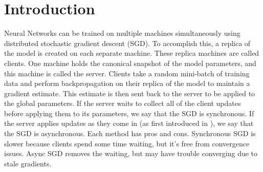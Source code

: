 \documentclass{article} %
\title{\scalebox{1}{Faster Asynchronous SGD}}
\author{
\hspace{20mm} Augustus Odena \\
\hspace{10mm} \texttt{augustus.odena@gmail.com}
}
\begin{document}
\begin{center}
\maketitle
\end{center}

\begin{abstract}

Asynchronous distributed stochastic gradient descent methods have trouble converging because of stale gradients.
A gradient update sent to a parameter server by a client is stale if the parameters used to calculate that gradient have since been updated on the server.
Approaches have been proposed to circumvent this problem that quantify staleness in terms of the number of elapsed updates.
In this work, we propose a method that quantifies staleness in terms of trailing gradient statistics.
We show that this method outperforms previous methods with respect to convergence speed and scalability to many clients.
We also discuss how an extension to this method can be used to dramatically reduce bandwidth costs
in a distributed training context.
In particular, our method allows reduction of total bandwidth usage by a factor of 25 with little impact on
cost convergence.
We also describe (and link to) a software library that we have used to simulate these algorithms
deterministically on a single machine.

\end{abstract}

\section{Introduction}
Neural Networks can be trained on multiple machines simultaneously using distributed stochastic gradient descent (SGD).
To accomplish this, a replica of the model is created on each separate machine. These replica machines are called clients.
One machine holds the canonical snapshot of the model parameters, and this machine is called the server.
Clients take a random mini-batch of training data and perform backpropagation on their replica of the model to maintain a gradient estimate.
This estimate is then sent back to the server to be applied to the global parameters.
If the server waits to collect all of the client updates before applying them to its parameters, we say that the SGD is synchronous.
If the server applies updates as they come in (as first introduced in \cite{FirstASGD}), we say that the SGD is asynchronous.
Each method has pros and cons.
Synchronous SGD is slower because clients spend some time waiting, but it's free from convergence issues.
Async SGD removes the waiting, but may have trouble converging due to stale gradients.
\end{document}
